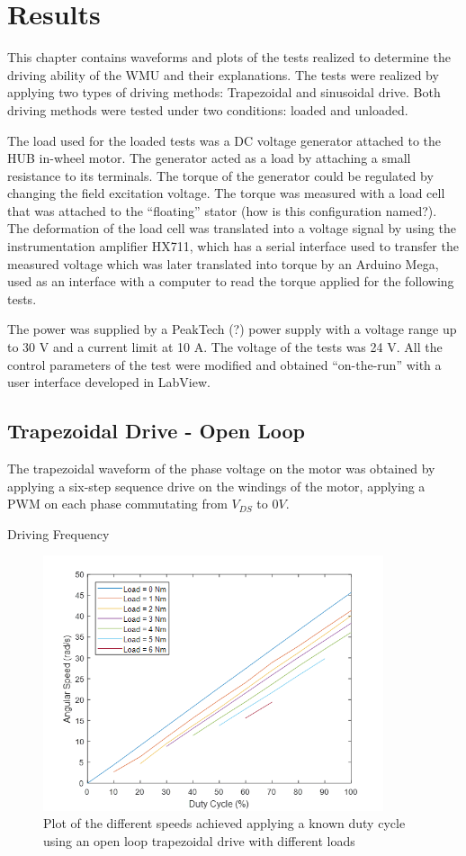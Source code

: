 \chapter{Results} \label{chap:results}

This chapter contains waveforms and plots of the tests realized to determine the driving ability of the \ac{WMU} and their explanations. The tests were realized by applying two types of driving methods: Trapezoidal and sinusoidal drive. Both driving methods were tested under two conditions: loaded and unloaded. 

The load used for the loaded tests was a DC voltage generator attached to the HUB in-wheel motor. The generator acted as a load by attaching a small resistance to its terminals. The torque of the generator could be regulated by changing the field excitation voltage. The torque was measured with a load cell that was attached to the “floating” stator (how is this configuration named?). The deformation of the load cell was translated into a voltage signal by using the instrumentation amplifier HX711, which has a serial interface used to transfer the measured voltage which was later translated into torque by an Arduino Mega, used as an interface with a computer to read the torque applied for the following tests.

The power was supplied by a PeakTech (?) power supply with a voltage range up to 30 V and a current limit at 10 A. The voltage of the tests was 24 V.
All the control parameters of the test were modified and obtained “on-the-run” with a user interface developed in LabView.

\section{Trapezoidal Drive - Open Loop}

The trapezoidal waveform of the phase voltage on the motor was obtained by applying a six-step sequence drive on the windings of the motor, applying a \ac{PWM} on each phase commutating from $V_{DS}$ to $0V$.

Driving Frequency

\begin{figure}[htbp]
\centering
\includegraphics[width=10cm]{Images/plots/plot_1.png} 
\caption[plot1]{Plot of the different speeds achieved applying a known duty cycle using an open loop trapezoidal drive with different loads}
\label{fig:plot1}
\end{figure}

